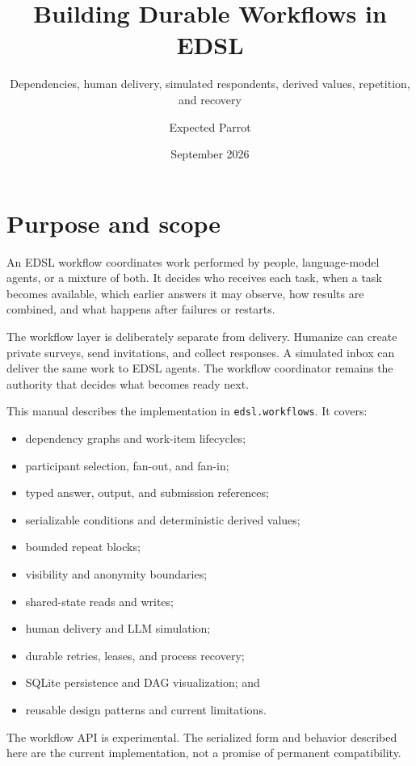 \documentclass[
  10pt,
]{report}
\title{Building Durable Workflows in EDSL}
\subtitle{Dependencies, human delivery, simulated respondents, derived
values, repetition, and recovery}
\author{Expected Parrot}
\date{September 2026}
\providecommand{\tightlist}{%
  \setlength{\itemsep}{0pt}\setlength{\parskip}{0pt}}
\begin{document}
\maketitle

{
\hypersetup{linkcolor=}
\setcounter{tocdepth}{3}
\tableofcontents
}
\chapter{Purpose and scope}\label{purpose-and-scope}

An EDSL workflow coordinates work performed by people, language-model
agents, or a mixture of both. It decides who receives each task, when a
task becomes available, which earlier answers it may observe, how
results are combined, and what happens after failures or restarts.

The workflow layer is deliberately separate from delivery. Humanize can
create private surveys, send invitations, and collect responses. A
simulated inbox can deliver the same work to EDSL agents. The workflow
coordinator remains the authority that decides what becomes ready next.

This manual describes the implementation in \texttt{edsl.workflows}. It
covers:

\begin{itemize}
\tightlist
\item
  dependency graphs and work-item lifecycles;
\item
  participant selection, fan-out, and fan-in;
\item
  typed answer, output, and submission references;
\item
  serializable conditions and deterministic derived values;
\item
  bounded repeat blocks;
\item
  visibility and anonymity boundaries;
\item
  shared-state reads and writes;
\item
  human delivery and LLM simulation;
\item
  durable retries, leases, and process recovery;
\item
  SQLite persistence and DAG visualization; and
\item
  reusable design patterns and current limitations.
\end{itemize}

The workflow API is experimental. The serialized form and behavior
described here are the current implementation, not a promise of
permanent compatibility.
\end{document}
